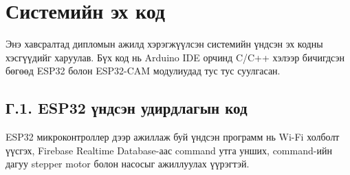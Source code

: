 \documentclass[12pt,a4paper]{report}
\begin{document}
\section{Системийн эх код}

Энэ хавсралтад дипломын ажилд хэрэгжүүлсэн системийн үндсэн эх кодны хэсгүүдийг харуулав. Бүх код нь Arduino IDE орчинд C/C++ хэлээр бичигдсэн бөгөөд ESP32 болон ESP32-CAM модулиудад тус тус суулгасан.

\subsection*{Г.1. ESP32 үндсэн удирдлагын код}

ESP32 микроконтроллер дээр ажиллаж буй үндсэн программ нь Wi-Fi холболт үүсгэх, Firebase Realtime Database-аас command утга унших, command-ийн дагуу stepper motor болон насосыг ажиллуулах үүрэгтэй.
\end{document}
